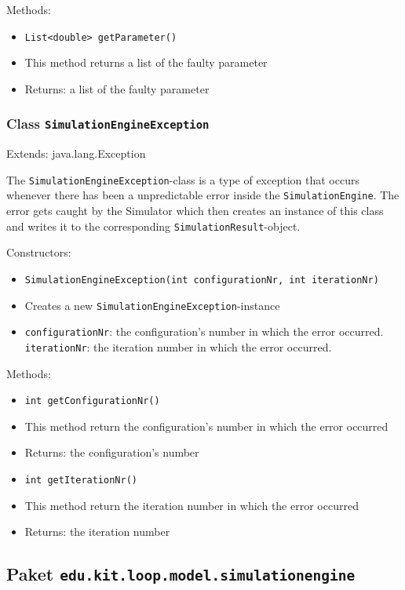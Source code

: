 \documentclass[parskip=full,11pt]{scrartcl}
\begin{document}
Methods:
\begin{itemize}\itemsep -10pt
	\item \texttt{List<double> getParameter()}
	\item[] This method returns a list of the faulty parameter
	\item[] Returns: a list of the faulty parameter
\end{itemize}

\subsubsection{Class \texttt{SimulationEngineException}}
Extends: java.lang.Exception

The \texttt{SimulationEngineException}-class is a type of exception that occurs whenever there has been a unpredictable error inside the \texttt{SimulationEngine}. The error gets caught by the Simulator which then creates an instance of this class and writes it to the corresponding \texttt{SimulationResult}-object.

Constructors:
\begin{itemize}\itemsep -10pt
	\item \texttt{SimulationEngineException(int configurationNr, int iterationNr)}
	\item[] Creates a new \texttt{SimulationEngineException}-instance
	\item[] \texttt{configurationNr}: the configuration's number in which the error occurred.
	\texttt{iterationNr}: the iteration number in which the error occurred.
\end{itemize}

Methods:
\begin{itemize} \itemsep -10pt
	\item \texttt{int getConfigurationNr()}
	\item[] This method return the configuration's number in which the error occurred
	\item[] Returns: the configuration's number
	\item \texttt{int getIterationNr()}
	\item[] This method return the iteration number in which the error occurred
	\item[] Returns: the iteration number
\end{itemize}

\subsection{Paket \texttt{edu.kit.loop.model.simulationengine}}
\end{document}
